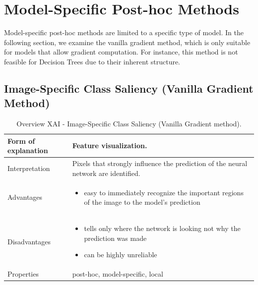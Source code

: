 
\newpage
\section{Model-Specific Post-hoc Methods}\label{sec:5}

Model-specific post-hoc methods are limited to a specific type of model. In the following section, we examine the vanilla gradient method, which is only suitable for models that allow gradient computation. For instance, this method is not feasible for Decision Trees due to their inherent structure.

\subsection*{Image-Specific Class Saliency (Vanilla Gradient Method)}

\begin{table}[H]
  \centering
  \begin{tabular}{|p{}|p{}|}
    \hline
    Form of \newline explanation & 
    Feature visualization. \\
    
    \hline
    Interpretation & 
    Pixels that strongly influence the prediction of the neural network are identified. \\
    \hline
    Advantages &
    \begin{itemize}[nosep, left=0em]
        \item easy to immediately recognize the important regions of the image to the model's prediction
    \end{itemize} \\
    
    \hline
    Disadvantages &
    \begin{itemize}[nosep, left=0em]
        \item tells only where the network is looking not why the prediction was made
        \item can be highly unreliable
    \end{itemize} \\
    
    \hline
    Properties & 
    post-hoc, model-specific, local  \\
    
    \hline
  \end{tabular}
  \caption[Overview XAI - Image-Specific Class Saliency (Vanilla Gradient method)]{Overview XAI - Image-Specific Class Saliency (Vanilla Gradient method).}
  \label{tab:VanillaGradient}
\end{table}

